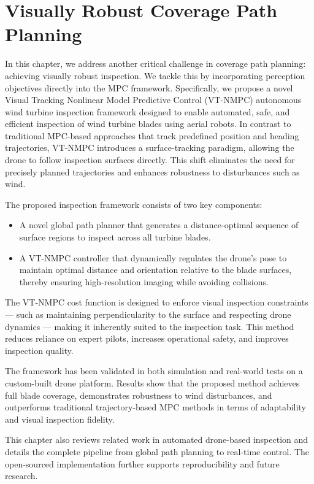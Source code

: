 \chapter{Visually Robust Coverage Path Planning}
\label{ch:vtnmpc}

In this chapter, we address another critical challenge in coverage path planning: achieving visually robust inspection. We tackle this by incorporating perception objectives directly into the MPC framework. Specifically, we propose a novel Visual Tracking Nonlinear Model Predictive Control (VT-NMPC) autonomous wind turbine inspection framework designed to enable automated, safe, and efficient inspection of wind turbine blades using aerial robots. In contrast to traditional MPC-based approaches that track predefined position and heading trajectories, VT-NMPC introduces a surface-tracking paradigm, allowing the drone to follow inspection surfaces directly. This shift eliminates the need for precisely planned trajectories and enhances robustness to disturbances such as wind.

The proposed inspection framework consists of two key components:
\begin{itemize}
    
\item A novel global path planner that generates a distance-optimal sequence of surface regions to inspect across all turbine blades.

\item  A VT-NMPC controller that dynamically regulates the drone’s pose to maintain optimal distance and orientation relative to the blade surfaces, thereby ensuring high-resolution imaging while avoiding collisions.

\end{itemize}

The VT-NMPC cost function is designed to enforce visual inspection constraints — such as maintaining perpendicularity to the surface and respecting drone dynamics — making it inherently suited to the inspection task. This method reduces reliance on expert pilots, increases operational safety, and improves inspection quality.

The framework has been validated in both simulation and real-world tests on a custom-built drone platform. Results show that the proposed method achieves full blade coverage, demonstrates robustness to wind disturbances, and outperforms traditional trajectory-based MPC methods in terms of adaptability and visual inspection fidelity.

This chapter also reviews related work in automated drone-based inspection and details the complete pipeline from global path planning to real-time control. The open-sourced implementation further supports reproducibility and future research.